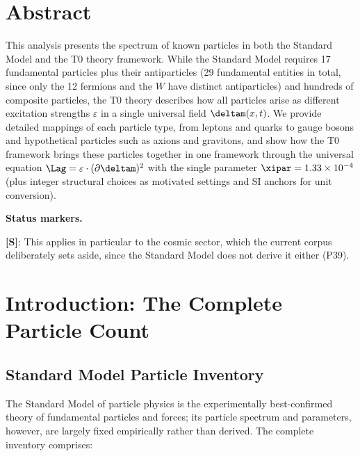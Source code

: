\section*{Abstract}
		This analysis presents the spectrum of known particles in both the Standard Model and the T0 theory framework. While the Standard Model requires 17 fundamental particles plus their antiparticles (29 fundamental entities in total, since only the 12 fermions and the $W$ have distinct antiparticles) and hundreds of composite particles, the T0 theory describes how all particles arise as different excitation strengths $\varepsilon$ in a single universal field $\deltam(x,t)$. We provide detailed mappings of each particle type, from leptons and quarks to gauge bosons and hypothetical particles such as axions and gravitons, and show how the T0 framework brings these particles together in one framework through the universal equation $\Lag = \varepsilon \cdot (\partial \deltam)^2$ with the single parameter $\xipar = 1.33 \times 10^{-4}$ (plus integer structural choices as motivated settings and SI anchors for unit conversion).

	\medskip\noindent\textbf{Status markers.}
	

	\noindent \textbf{[S]}: This applies in particular to the cosmic sector, which the current corpus deliberately sets aside, since the Standard Model does not derive it either (P39).

	
	
	\section{Introduction: The Complete Particle Count}
	
	\subsection{Standard Model Particle Inventory}
	
	The Standard Model of particle physics is the experimentally best-confirmed theory of fundamental particles and forces; its particle spectrum and parameters, however, are largely fixed empirically rather than derived. The complete inventory comprises:
	
